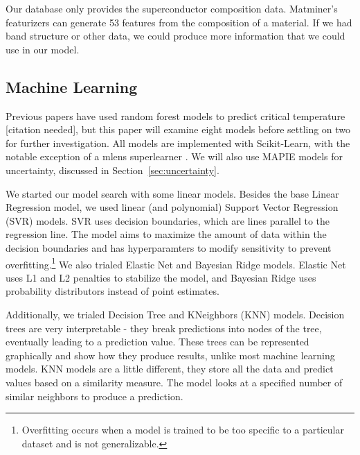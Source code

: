 \documentclass[twocolumn, nofootinbib, secnumarabic, amssymb, nobibnotes, aps, prd]{revtex4-2}
\begin{document}

Our database only provides the superconductor composition data. Matminer's featurizers can generate 53 features from the composition of a material. If we had band structure or other data, we could produce more information that we could use in our model.

\subsection{Machine Learning}
Previous papers have used random forest models to predict critical temperature [citation needed], but this paper will examine eight models before settling on two for further investigation. All models are implemented with Scikit-Learn, with the notable exception of a mlens superlearner \cite{scikit-learn, flennerhag:2017mlens}. We will also use MAPIE models for uncertainty, discussed in Section~\ref{sec:uncertainty}.

We started our model search with some linear models. Besides the base Linear Regression model, we used linear (and polynomial) Support Vector Regression (SVR) models. SVR uses decision boundaries, which are lines parallel to the regression line. The model aims to maximize the amount of data within the decision boundaries and has hyperparamters to modify sensitivity to prevent overfitting.\footnote{Overfitting occurs when a model is trained to be too specific to a particular dataset and is not generalizable.} We also trialed Elastic Net and Bayesian Ridge models. Elastic Net uses L1 and L2 penalties to stabilize the model, and Bayesian Ridge uses probability distributors instead of point estimates.

Additionally, we trialed Decision Tree and KNeighbors (KNN) models. Decision trees are very interpretable - they break predictions into nodes of the tree, eventually leading to a prediction value. These trees can be represented graphically and show how they produce results, unlike most machine learning models. KNN models are a little different, they store all the data and predict values based on a similarity measure. The model looks at a specified number of similar neighbors to produce a prediction.
\end{document}
